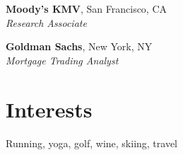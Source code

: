 \documentclass[margin,line,11pt]{resume}
\begin{document}
\begin{resume}
    {\bf Moody's KMV}, San Francisco, CA \\ \vspace{.5mm}%
    {\sl Research Associate}

    {\bf Goldman Sachs}, New York, NY \\ \vspace{.5mm}%
    {\sl Mortgage Trading Analyst}



    \section{\mysidestyle Interests}

  Running, yoga, golf, wine, skiing, travel








\end{resume}
\end{document}
